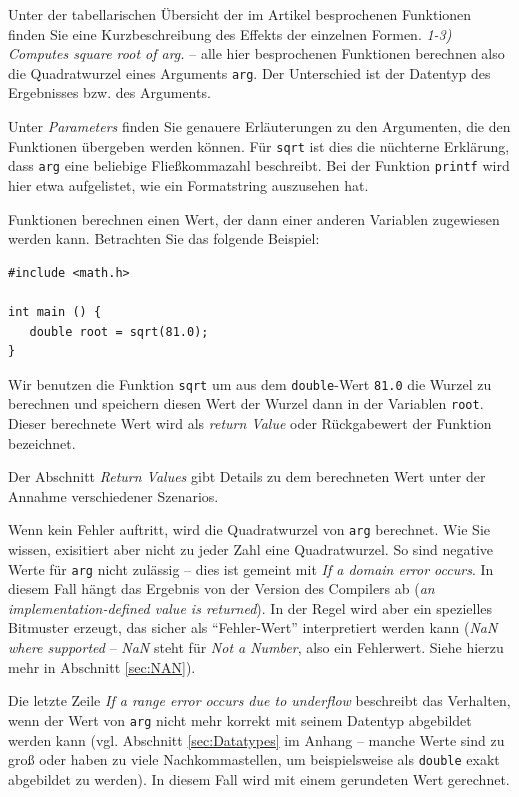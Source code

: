 Unter der tabellarischen Übersicht der im Artikel besprochenen Funktionen finden Sie eine Kurzbeschreibung des Effekts der einzelnen Formen. \emph{1-3) Computes square root of arg.} -- alle hier besprochenen Funktionen berechnen also die Quadratwurzel eines Arguments \texttt{arg}. Der Unterschied ist der Datentyp des Ergebnisses bzw. des Arguments.

Unter \emph{Parameters} finden Sie genauere Erläuterungen zu den Argumenten, die den Funktionen übergeben werden können. Für \texttt{sqrt} ist dies die nüchterne Erklärung, dass \texttt{arg} eine beliebige Fließkommazahl beschreibt. Bei der Funktion \texttt{printf} wird hier etwa aufgelistet, wie ein Formatstring auszusehen hat.

Funktionen berechnen einen Wert, der dann einer anderen Variablen zugewiesen werden kann. Betrachten Sie das folgende Beispiel:

\begin{codebox}
\begin{verbatim}
#include <math.h>

int main () {
   double root = sqrt(81.0);
}
\end{verbatim}
\end{codebox}

Wir benutzen die Funktion \texttt{sqrt} um aus dem \texttt{double}-Wert \texttt{81.0} die Wurzel zu berechnen und speichern diesen Wert der Wurzel dann in der Variablen \texttt{root}. Dieser berechnete Wert wird als \emph{return Value} oder Rückgabewert der Funktion bezeichnet.

Der Abschnitt \emph{Return Values} gibt Details zu dem berechneten Wert unter der Annahme verschiedener Szenarios.

Wenn kein Fehler auftritt, wird die Quadratwurzel von \texttt{arg} berechnet. Wie Sie wissen, exisitiert aber nicht zu jeder Zahl eine Quadratwurzel. So sind negative Werte für \texttt{arg} nicht zulässig -- dies ist gemeint mit \emph{If a domain error occurs}. In diesem Fall hängt das Ergebnis von der Version des Compilers ab (\emph{an implementation-defined value is returned}). In der Regel wird aber ein spezielles Bitmuster erzeugt, das sicher als \enquote{Fehler-Wert} interpretiert werden kann (\emph{NaN where supported} -- \emph{NaN} steht für \emph{Not a Number}, also ein Fehlerwert. Siehe hierzu mehr in Abschnitt \ref{sec:NAN}).

Die letzte Zeile \emph{If a range error occurs due to underflow} beschreibt das Verhalten, wenn der Wert von \texttt{arg} nicht mehr korrekt mit seinem Datentyp abgebildet werden kann (vgl. Abschnitt \ref{sec:Datatypes} im Anhang -- manche Werte sind zu groß oder haben zu viele Nachkommastellen, um beispielsweise als \texttt{double} exakt abgebildet zu werden). In diesem Fall wird mit einem gerundeten Wert gerechnet.

